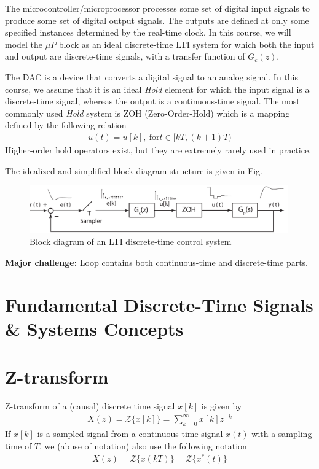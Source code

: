 \documentclass[twoside]{article}
\begin{document}
The microcontroller/microprocessor processes some set of digital input signals to produce some set of digital output signals. The outputs are defined at only some specified instances determined by the real-time clock. In this course, we will model the $\mu P$ block as an ideal discrete-time LTI system for which both the input and output are discrete-time signals, with a transfer function of $G_c(z)$.

The DAC is a device that converts a digital signal to an analog signal. In this course, we assume that it is an ideal \textit{Hold} element for which the input signal is a discrete-time signal, whereas the output is a continuous-time signal. The most commonly used \textit{Hold} system is ZOH (Zero-Order-Hold) which is a mapping  defined by the following relation
%
\begin{align*}
  u(t) = u[k] , \ \mathrm{for} t \in [kT , (k+1)T )
\end{align*}
%
Higher-order hold operators exist, but they are extremely rarely used in practice. 

The idealized and simplified block-diagram structure is given in Fig.

\begin{figure}[h]
    \centering
      \includegraphics[width=0.99\textwidth]{idealblock}
    \caption{Block diagram of an LTI discrete-time control system}
    \label{fig:introblock}
\end{figure}

\textbf{Major challenge:} Loop contains both continuous-time and discrete-time parts.

\newpage

\section*{Fundamental Discrete-Time Signals \& Systems Concepts}

\section{Z-transform}
%
Z-transform of a (causal) discrete time signal $x[k]$ is given by 
%
\begin{align*}
  X(z) = \mathcal{Z} \lbrace x[k] \rbrace = \sum\limits_{k=0}^{\infty} x[k] z^{-k} 
\end{align*}
%
If $x[k]$ is a sampled signal from a continuous time signal $x(t)$
with a sampling time of $T$, we (abuse of notation) also use the
following notation
%
\begin{align*}
  X(z) = \mathcal{Z} \lbrace x(kT) \rbrace = \mathcal{Z} \lbrace x^*(t) \rbrace 
\end{align*}
% 
\end{document}
